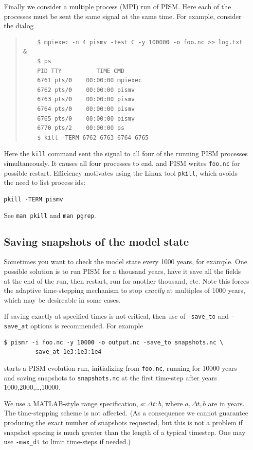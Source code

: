 \documentclass[11pt,final]{amsart}
\begin{document}
\smallskip

Finally we consider a multiple process (MPI) run of PISM.  Here each of the processes must be sent the same signal at the same time.  For example, consider the dialog
\begin{quote}
\begin{verbatim}
	$ mpiexec -n 4 pismv -test C -y 100000 -o foo.nc >> log.txt &
	$ ps
	PID TTY          TIME CMD
	6761 pts/0    00:00:00 mpiexec
	6762 pts/0    00:00:00 pismv
	6763 pts/0    00:00:00 pismv
	6764 pts/0    00:00:00 pismv
	6765 pts/0    00:00:00 pismv
	6770 pts/2    00:00:00 ps
	$ kill -TERM 6762 6763 6764 6765
\end{verbatim}
\end{quote}
Here the \verb|kill| command sent the signal to all four of the running PISM processes simultaneously.  It causes all four processes to end, and PISM writes \verb|foo.nc| for possible restart.  Efficiency motivates using the Linux tool \verb|pkill|, which avoids the need to list process ids:

  \verb|pkill -TERM pismv|

\noindent See \verb|man pkill| and \verb|man pgrep|.



\subsection{Saving snapshots of the model state}
\label{sec:snapshots}  Sometimes you want to check the model state every 1000 years, for example.  One possible solution is to run PISM for a thousand years, have it save all the fields at the end of the run, then restart, run for another thousand, etc.  Note this forces the adaptive time-stepping mechanism to stop \emph{exactly} at multiples of 1000 years, which may be desireable in some cases.

If saving exactly at specified times is not critical, then use of \verb|-save_to| and \verb|-save_at| options is recommended.  For example
\begin{verbatim}
$ pismr -i foo.nc -y 10000 -o output.nc -save_to snapshots.nc \
        -save_at 1e3:1e3:1e4
\end{verbatim}
starts a PISM evolution run, initializing from \verb|foo.nc|, running for
10000 years and saving snapshots to \verb|snapshots.nc| at the first time-step
after years 1000,2000,\dots,10000.

We use a MATLAB-style range specification, $a:\Delta t:b$, where $a,\Delta t,b$ are in years.  The time-stepping scheme is not affected.  (As a consequence we cannot guarantee producing the exact number of snapshots requested, but this is not a problem if snapshot spacing is much greater than the length of a typical timestep.  One may use \verb|-max_dt| to limit time-steps if needed.)
\end{document}
